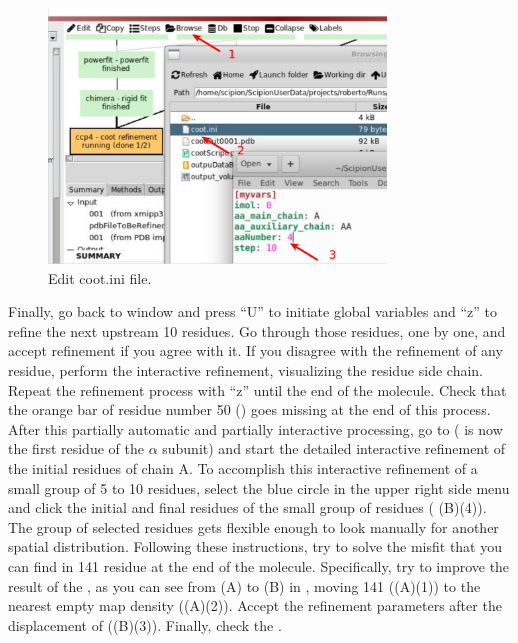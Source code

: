   \begin{figure}[H]
  \centering 
  \captionsetup{width=.7\linewidth} 
  \includegraphics[width=0.80\textwidth]{Images/cootini}
  \caption{Edit coot.ini file.}
  \label{fig:cootini}
  \end{figure}
  
 Finally, go back to \coot window and press ``U'' to initiate global variables and ``z'' to refine the next upstream 10 residues. Go through those residues, one by one, and accept refinement if you agree with it. If you disagree with the refinement of any residue, perform the interactive refinement, visualizing the residue side chain. Repeat the refinement process with ``z'' until the end of the molecule. Check that the orange bar of residue number 50 () goes missing at the end of this process.\\
 
 After this partially automatic and partially interactive processing, go to  ( is now the first residue of the  $\alpha$ subunit) and start the detailed interactive refinement of the initial residues of chain A. To accomplish this interactive refinement of a small group of 5 to 10 residues, select the blue circle in the upper right side menu and click the initial and final residues of the small group of residues ( (B)(4)). The group of selected residues gets flexible enough to look manually for another spatial distribution. Following these instructions, try to solve the misfit that you can find in  141 residue at the end of the molecule. Specifically, try to improve the result of the , as you can see from (A) to (B) in , moving  141 ((A)(1)) to the nearest empty map density ((A)(2)). Accept the refinement parameters after the displacement of  ((B)(3)). Finally, check the .
 
